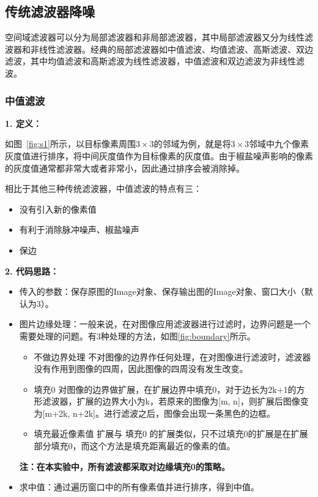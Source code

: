 \documentclass[lang=cn,10pt]{elegantbook}
\begin{document}
\subsection{传统滤波器降噪}
空间域滤波器可以分为局部滤波器和非局部滤波器，其中局部滤波器又分为线性滤波器和非线性滤波器。经典的局部滤波器如中值滤波、均值滤波、高斯滤波、双边滤波，其中均值滤波和高斯滤波为线性滤波器，中值滤波和双边滤波为非线性滤波。




\subsubsection{中值滤波}
\textcolor{third}{\textbf{1. 定义：}}

如图~\ref{fig:s1}所示，以目标像素周围$3 \times 3$的邻域为例，就是将$3 \times 3$邻域中九个像素灰度值进行排序，将中间灰度值作为目标像素的灰度值。由于椒盐噪声影响的像素的灰度值通常都非常大或者非常小，因此通过排序会被消除掉。

相比于其他三种传统滤波器，中值滤波的特点有三：
\begin{itemize}
 \item 没有引入新的像素值
 \item 有利于消除脉冲噪声、椒盐噪声
 \item 保边
\end{itemize}

\textcolor{third}{\textbf{2. 代码思路：}}

\begin{itemize}
\item 传入的参数：保存原图的Image对象、保存输出图的Image对象、窗口大小（默认为3）。

\item 图片边缘处理：一般来说，在对图像应用滤波器进行过滤时，边界问题是一个需要处理的问题。有3种处理的方法，如图\ref{fig:boundary}所示。
    \begin{itemize}
    \item 不做边界处理
不对图像的边界作任何处理，在对图像进行滤波时，滤波器没有作用到图像的四周，因此图像的四周没有发生改变。
    \item 填充0
对图像的边界做扩展，在扩展边界中填充0，对于边长为2k+1的方形滤波器，扩展的边界大小为k，若原来的图像为[m, n]，则扩展后图像变为[m+2k, n+2k]。进行滤波之后，图像会出现一条黑色的边框。
    \item 填充最近像素值
扩展与 填充0 的扩展类似，只不过填充0的扩展是在扩展部分填充0，而这个方法是填充距离最近的像素的值。
    \end{itemize}

\textcolor{main}{\textbf{注：在本实验中，所有滤波都采取对边缘填充0的策略。}}

\item 求中值：通过遍历窗口中的所有像素值并进行排序，得到中值。

\end{itemize}
\end{document}
